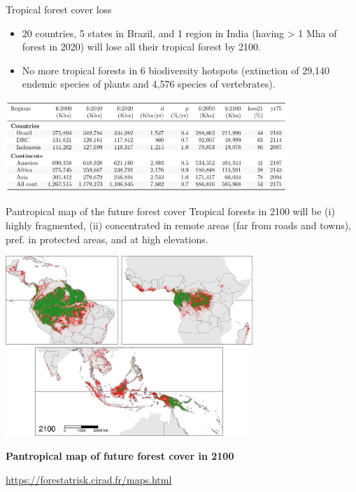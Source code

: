 \documentclass[10pt,table,dvipsnames,compress]{beamer}
\begin{document}
\begin{frame}[label={sec:org9a585f5}]{Tropical forest cover loss}
\small
\begin{itemize}
\item 20 countries, 5 states in Brazil, and 1 region in India (having > 1
Mha of forest in 2020) will lose all their tropical forest by 2100.
\item No more tropical forests in 6 biodiversity hotspots (extinction of
29,140 endemic species of plants and 4,576 species of vertebrates).
\end{itemize}

\centering \includegraphics[width=0.8\textwidth]{figs/defor-tab}
\end{frame}

\begin{frame}[label={sec:orgcbed510}]{Pantropical map of the future forest cover}
\small
Tropical forests in 2100 will be (i) highly fragmented, (ii)
concentrated in remote areas (far from roads and towns), pref. in
protected areas, and at high elevations.

\centering \includegraphics[width=0.7\textwidth]{figs/article/fcc2100}

\textbf{Pantropical map of future forest cover in 2100}

\url{https://forestatrisk.cirad.fr/maps.html}
\end{frame}
\end{document}
